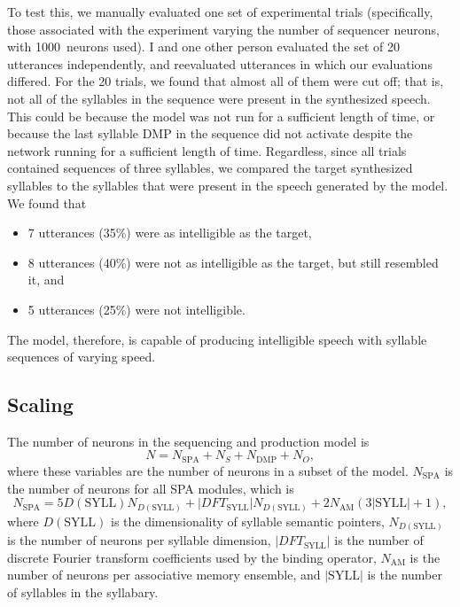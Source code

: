 To test this, we manually evaluated
one set of experimental trials
(specifically, those associated with
the experiment varying the number of
sequencer neurons,
with 1000~neurons used).
I and one other person evaluated
the set of 20 utterances independently,
and reevaluated utterances
in which our evaluations differed.
For the 20 trials,
we found that
almost all of them were cut off;
that is, not all of the syllables
in the sequence were present
in the synthesized speech.
This could be because the model
was not run for a sufficient length of time,
or because the last syllable DMP in the sequence
did not activate
despite the network running
for a sufficient length of time.
Regardless, since all trials
contained sequences of three syllables,
we compared the target synthesized syllables
to the syllables that were present
in the speech generated by the model.
We found that
\begin{itemize}
  \item 7 utterances (35\%) were as intelligible as the target,
  \item 8 utterances (40\%) were not as intelligible as the target,
    but still resembled it, and
  \item 5 utterances (25\%) were not intelligible.
\end{itemize}

The model, therefore,
is capable of producing intelligible speech
with syllable sequences of varying speed.

\subsection{Scaling}
\label{sec:res-prod-scaling}

The number of neurons in the
sequencing and production model is
\begin{equation*}
  N = N_{\text{SPA}} + N_S + N_{\text{DMP}} + N_O,
\end{equation*}
where these variables
are the number of neurons in
a subset of the model.
$N_{\text{SPA}}$ is the number of
neurons for all SPA modules,
which is
\begin{equation*}
  N_{\text{SPA}} = 5 D(\text{SYLL}) N_{D(\text{SYLL})} +
      |DFT_{\text{SYLL}}| N_{D(\text{SYLL})}
      + 2 N_{\text{AM}} (3 |\text{SYLL}| + 1),
\end{equation*}
where $D(\text{SYLL})$ is the dimensionality
of syllable semantic pointers,
$N_{D(\text{SYLL})}$ is the number of neurons
per syllable dimension,
$|DFT_{\text{SYLL}}|$ is the number of
discrete Fourier transform coefficients
used by the binding operator,
$N_{\text{AM}}$ is the number of neurons
per associative memory ensemble,
and $|\text{SYLL}|$ is the number of
syllables in the syllabary.

